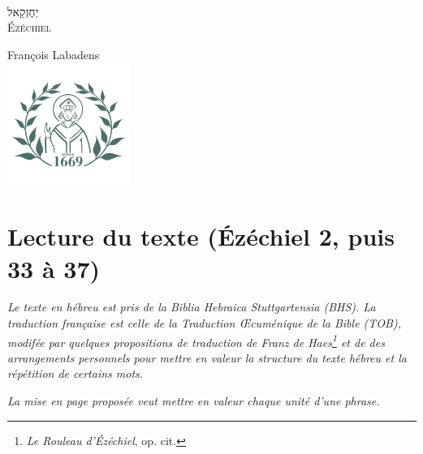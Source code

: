 \documentclass[12pt,a4paper,titlepage]{article}
\author{}
\date{}
\begin{document}
\thispagestyle{empty} %

~
\vspace{10em}
\begin{center}
\fontsize{60}{70}\selectfont \texthebrew{יְחֶזְקֵאל}\\
\fontsize{50}{40}\selectfont \textsc{Ézéchiel} \par
\normalsize François Labadens \\
\vfill
\includegraphics[width=4cm]{../assets/seminaire_lyon.png}
\end{center}

\newpage
\setcounter{page}{2} %

\newpage

\vspace{2em}

\newpage

\newpage

\newpage

\vspace{2em}
\section*{Lecture du texte (Ézéchiel 2, puis 33 à 37)}
\textit{Le texte en hébreu est pris de la Biblia Hebraica Stuttgartensia (BHS).
La traduction française est celle de la Traduction Œcuménique de la Bible (TOB), modifée par quelques propositions de traduction de Franz de Haes\footnote{\textit{Le Rouleau d'Ézéchiel}, op. cit.} et de des arrangements personnels pour mettre en valeur la structure du texte hébreu et la répétition de certains mots.}\par
\textit{La mise en page proposée veut mettre en valeur chaque unité d'une phrase.}
\newpage

\end{document}
